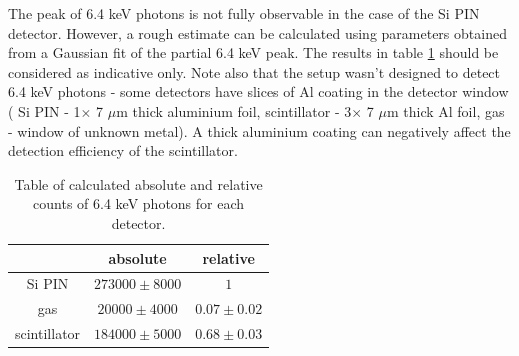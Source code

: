 The peak of 6.4 keV photons is not fully observable in the case of the Si PIN detector. However, a rough estimate can be calculated using parameters obtained from a Gaussian fit of the partial 6.4 keV peak. The results in table \ref{64kevEFF} should be considered as indicative only. Note also that the setup wasn't designed to detect 6.4 keV photons - some detectors have slices of Al coating in the detector window ( Si PIN - 1$\times$ 7 $\mu$m thick aluminium foil, scintillator - 3$\times$ 7 $\mu$m thick Al foil, gas - window of unknown metal). A thick aluminium coating can negatively affect the detection efficiency of the scintillator.

\begin{table}[H]
\centering
\begin{tabular}{|c|c|c|}
\hline
   & absolute & relative \\ \hline
Si PIN & $273000 \pm 8000$    & $1$  \\ \hline
gas & $20000 \pm 4000$    & $0.07 \pm 0.02$ \\ \hline
scintillator  & $184000 \pm 5000$    & $0.68 \pm 0.03$ \\ \hline
\end{tabular}
\caption{Table of calculated absolute and relative counts of 6.4 keV photons for each detector.}
 \label{64kevEFF}
\end{table}


